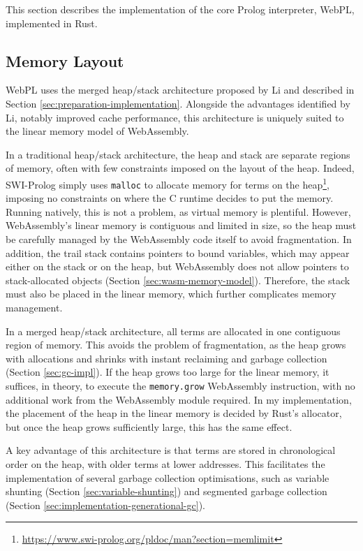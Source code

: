 \label{sec:core-interpreter}

This section describes the implementation of the core Prolog interpreter, WebPL, implemented in Rust.

\subsection{Memory Layout}

\label{sec:memory-layout}

WebPL uses the merged heap/stack architecture proposed by Li \cite{liEfficientMemoryManagement2000} and described in Section \ref{sec:preparation-implementation}. Alongside the advantages identified by Li, notably improved cache performance, this architecture is uniquely suited to the linear memory model of WebAssembly.

In a traditional heap/stack architecture, the heap and stack are separate regions of memory, often with few constraints imposed on the layout of the heap. Indeed, SWI-Prolog simply uses \texttt{malloc} to allocate memory for terms on the heap\footnote{\url{https://www.swi-prolog.org/pldoc/man?section=memlimit}}, imposing no constraints on where the C runtime decides to put the memory. Running natively, this is not a problem, as virtual memory is plentiful. However, WebAssembly's linear memory is contiguous and limited in size, so the heap must be carefully managed by the WebAssembly code itself to avoid fragmentation. In addition, the trail stack contains pointers to bound variables, which may appear either on the stack or on the heap, but WebAssembly does not allow pointers to stack-allocated objects (Section \ref{sec:wasm-memory-model}). Therefore, the stack must also be placed in the linear memory, which further complicates memory management.

In a merged heap/stack architecture, all terms are allocated in one contiguous region of memory. This avoids the problem of fragmentation, as the heap grows with allocations and shrinks with instant reclaiming and garbage collection (Section \ref{sec:gc-impl}). If the heap grows too large for the linear memory, it suffices, in theory, to execute the \texttt{memory.grow} WebAssembly instruction, with no additional work from the WebAssembly module required. In my implementation, the placement of the heap in the linear memory is decided by Rust's allocator, but once the heap grows sufficiently large, this has the same effect.

A key advantage of this architecture is that terms are stored in chronological order on the heap, with older terms at lower addresses. This facilitates the implementation of several garbage collection optimisations, such as variable shunting (Section \ref{sec:variable-shunting}) and segmented garbage collection (Section \ref{sec:implementation-generational-gc}).

